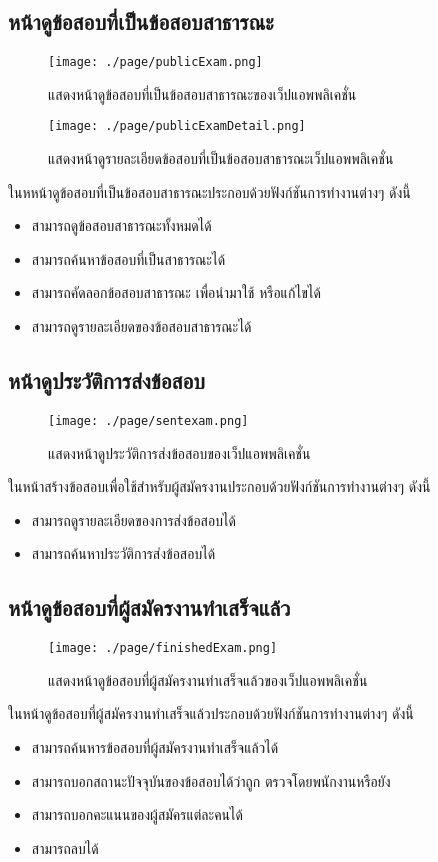 \subsection{หน้าดูข้อสอบที่เป็นข้อสอบสาธารณะ}
\begin{figure}[H]
  \centering
  \texttt{[image: ./page/publicExam.png]}
  \caption{แสดงหน้าดูข้อสอบที่เป็นข้อสอบสาธารณะของเว็ปแอพพลิเคชั่น}
  \label{Fig:publicExams}
\end{figure}
\begin{figure}[H]
  \centering
  \texttt{[image: ./page/publicExamDetail.png]}
  \caption{แสดงหน้าดูรายละเอียดข้อสอบที่เป็นข้อสอบสาธารณะเว็ปแอพพลิเคชั่น}
  \label{Fig:publicExamDetails}
\end{figure}
ในหหน้าดูข้อสอบที่เป็นข้อสอบสาธารณะประกอบด้วยฟังก์ชันการทำงานต่างๆ ดังนี้
\begin{itemize}
    \item สามารถดูข้อสอบสาธารณะทั้งหมดได้
    \item สามารถค้นหาข้อสอบที่เป็นสาธารณะได้
    \item สามารถคัดลอกข้อสอบสาธารณะ เพื่อนำมาใช้ หรือแก้ไขได้
    \item สามารถดูรายละเอียดของข้อสอบสาธารณะได้
\end{itemize}

\subsection{หน้าดูประวัติการส่งข้อสอบ}
\begin{figure}[H]
  \centering
  \texttt{[image: ./page/sentexam.png]}
  \caption{แสดงหน้าดูประวัติการส่งข้อสอบของเว็ปแอพพลิเคชั่น}
  \label{Fig:sentExam}
\end{figure}
ในหน้าสร้างข้อสอบเพื่อใช้สำหรับผู้สมัครงานประกอบด้วยฟังก์ชันการทำงานต่างๆ ดังนี้
\begin{itemize}
    \item สามารถดูรายละเอียดของการส่งข้อสอบได้
    \item สามารถค้นหาประวัติการส่งข้อสอบได้
\end{itemize}

\subsection{หน้าดูข้อสอบที่ผู้สมัครงานทำเสร็จแล้ว}
\begin{figure}[H]
  \centering
  \texttt{[image: ./page/finishedExam.png]}
  \caption{แสดงหน้าดูข้อสอบที่ผู้สมัครงานทำเสร็จแล้วของเว็ปแอพพลิเคชั่น}
  \label{Fig:finishedExam}
\end{figure}
ในหน้าดูข้อสอบที่ผู้สมัครงานทำเสร็จแล้วประกอบด้วยฟังก์ชันการทำงานต่างๆ ดังนี้
\begin{itemize}
    \item สามารถค้นหารข้อสอบที่ผู้สมัครงานทำเสร็จแล้วได้
    \item สามารถบอกสถานะปัจจุบันของข้อสอบได้ว่าถูก ตรวจโดยพนักงานหรือยัง
    \item สามารถบอกคะแนนของผู้สมัครแต่ละคนได้
    \item สามารถลบได้
\end{itemize}


